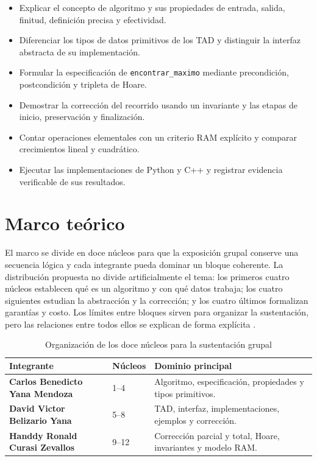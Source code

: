 \documentclass[12pt,letterpaper]{article}
\newcommand{\codigo}[1]{\texttt{#1}}
\begin{document}
\begin{itemize}
  \item Explicar el concepto de algoritmo y sus propiedades de entrada, salida, finitud, definición precisa y efectividad.
  \item Diferenciar los tipos de datos primitivos de los TAD y distinguir la interfaz abstracta de su implementación.
  \item Formular la especificación de \codigo{encontrar\_maximo} mediante precondición, postcondición y tripleta de Hoare.
  \item Demostrar la corrección del recorrido usando un invariante y las etapas de inicio, preservación y finalización.
  \item Contar operaciones elementales con un criterio RAM explícito y comparar crecimientos lineal y cuadrático.
  \item Ejecutar las implementaciones de Python y C++ y registrar evidencia verificable de sus resultados.
\end{itemize}

\clearpage
\section{Marco teórico}

El marco se divide en doce núcleos para que la exposición grupal conserve una secuencia lógica y cada integrante pueda dominar un bloque coherente. La distribución propuesta no divide artificialmente el tema: los primeros cuatro núcleos establecen qué es un algoritmo y con qué datos trabaja; los cuatro siguientes estudian la abstracción y la corrección; y los cuatro últimos formalizan garantías y costo. Los límites entre bloques sirven para organizar la sustentación, pero las relaciones entre todos ellos se explican de forma explícita \citep{zanabria2026,cormen2022,wirth1976}.

\begin{table}[htbp]
\centering
\caption{Organización de los doce núcleos para la sustentación grupal}
\begin{tabularx}{\textwidth}{>{\bfseries}p{3.2cm}p{3cm}X}
\toprule
Integrante & Núcleos & Dominio principal\\
\midrule
Carlos Benedicto Yana Mendoza & 1--4 & Algoritmo, especificación, propiedades y tipos primitivos.\\
David Victor Belizario Yana & 5--8 & TAD, interfaz, implementaciones, ejemplos y corrección.\\
Handdy Ronald Curasi Zevallos & 9--12 & Corrección parcial y total, Hoare, invariantes y modelo RAM.\\
\bottomrule
\end{tabularx}
\end{table}
\end{document}

